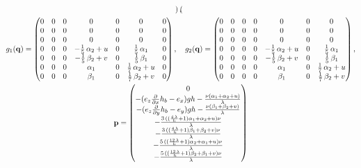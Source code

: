 \documentclass{article}
\begin{document}
\begin{gather}
\begin{pmatrix}
        \end{pmatrix}, \\
        g_1(\mathbf{q}) =
        \begin{pmatrix}
          0 & 0 & 0 & 0 & 0 & 0 & 0 \\
          0 & 0 & 0 & 0 & 0 & 0 & 0 \\
          0 & 0 & 0 & 0 & 0 & 0 & 0 \\
          0 & 0 & 0 & -\frac{1}{5} \, \alpha_{2} + u & 0 & \frac{1}{5} \, \alpha_{1} & 0 \\
          0 & 0 & 0 & -\frac{1}{5} \, \beta_{2} + v & 0 & \frac{1}{5} \, \beta_{1} & 0 \\
          0 & 0 & 0 & \alpha_{1} & 0 & \frac{1}{7} \, \alpha_{2} + u & 0 \\
          0 & 0 & 0 & \beta_{1} & 0 & \frac{1}{7} \, \beta_{2} + v & 0
        \end{pmatrix}, \quad
        g_2(\mathbf{q}) =
        \begin{pmatrix}
          0 & 0 & 0 & 0 & 0 & 0 & 0 \\
          0 & 0 & 0 & 0 & 0 & 0 & 0 \\
          0 & 0 & 0 & 0 & 0 & 0 & 0 \\
          0 & 0 & 0 & 0 & -\frac{1}{5} \, \alpha_{2} + u & 0 & \frac{1}{5} \, \alpha_{1} \\
          0 & 0 & 0 & 0 & -\frac{1}{5} \, \beta_{2} + v & 0 & \frac{1}{5} \, \beta_{1} \\
          0 & 0 & 0 & 0 & \alpha_{1} & 0 & \frac{1}{7} \, \alpha_{2} + u \\
          0 & 0 & 0 & 0 & \beta_{1} & 0 & \frac{1}{7} \, \beta_{2} + v
        \end{pmatrix}, \\
        \mathbf{p} =
        \begin{pmatrix}
          0 \\
          -{(e_{z} \frac{\partial}{\partial x}h_{b} - e_{x})} g h - \frac{\nu {(\alpha_{1} + \alpha_{2} + u)}}{\lambda} \\
          -{(e_{z} \frac{\partial}{\partial y}h_{b} - e_{y})} g h - \frac{\nu {(\beta_{1} + \beta_{2} + v)}}{\lambda} \\
          -\frac{3 \, {({(\frac{4 \, \lambda}{h} + 1)} \alpha_{1} + \alpha_{2} + u)} \nu}{\lambda} \\
          -\frac{3 \, {({(\frac{4 \, \lambda}{h} + 1)} \beta_{1} + \beta_{2} + v)} \nu}{\lambda} \\
          -\frac{5 \, {({(\frac{12 \, \lambda}{h} + 1)} \alpha_{2} + \alpha_{1} + u)} \nu}{\lambda} \\
          -\frac{5 \, {({(\frac{12 \, \lambda}{h} + 1)} \beta_{2} + \beta_{1} + v)} \nu}{\lambda}
        \end{pmatrix}
      \end{gather}
\end{document}
